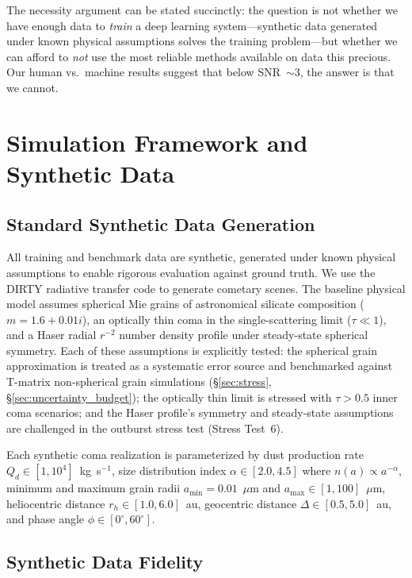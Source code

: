 \documentclass[usenatbib]{mnras}
\begin{document}
The necessity argument can be stated succinctly: the question is not whether we have enough data to \textit{train} a deep learning system---synthetic data generated under known physical assumptions solves the training problem---but whether we can afford to \textit{not} use the most reliable methods available on data this precious. Our human vs.\ machine results suggest that below SNR~$\sim 3$, the answer is that we cannot.

\section{Simulation Framework and Synthetic Data}\label{sec:simulation}

\subsection{Standard Synthetic Data Generation}

All training and benchmark data are synthetic, generated under known physical assumptions to enable rigorous evaluation against ground truth. We use the DIRTY radiative transfer code \citep{gordon01} to generate cometary scenes. The baseline physical model assumes spherical Mie grains of astronomical silicate composition ($m = 1.6 + 0.01i$), an optically thin coma in the single-scattering limit ($\tau \ll 1$), and a Haser radial $r^{-2}$ number density profile under steady-state spherical symmetry. Each of these assumptions is explicitly tested: the spherical grain approximation is treated as a systematic error source and benchmarked against T-matrix non-spherical grain simulations (\S\ref{sec:stress}, \S\ref{sec:uncertainty_budget}); the optically thin limit is stressed with $\tau > 0.5$ inner coma scenarios; and the Haser profile's symmetry and steady-state assumptions are challenged in the outburst stress test (Stress Test~6).

Each synthetic coma realization is parameterized by dust production rate $Q_d \in [1, 10^4]$~kg~s$^{-1}$, size distribution index $\alpha \in [2.0, 4.5]$ where $n(a) \propto a^{-\alpha}$, minimum and maximum grain radii $a_{\min} = 0.01$~$\mu$m and $a_{\max} \in [1, 100]$~$\mu$m, heliocentric distance $r_h \in [1.0, 6.0]$~au, geocentric distance $\Delta \in [0.5, 5.0]$~au, and phase angle $\phi \in [0^\circ, 60^\circ]$.

\subsection{Synthetic Data Fidelity}
\end{document}
